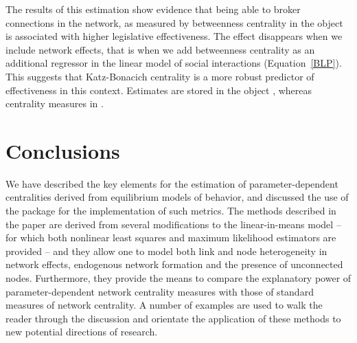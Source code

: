 \documentclass[nojss]{jss}
\begin{document}
%
The results of this estimation show evidence that being able to broker
connections in the network, as measured by betweenness centrality in the
object  is associated with higher legislative
effectiveness.  The effect disappears when we include network effects, that
is when we add betweenness centrality as an additional regressor in the
linear model of social interactions (Equation~\ref{BLP}).  This suggests
that Katz-Bonacich centrality is a more robust predictor of effectiveness in
this context.  Estimates are stored in the object
, whereas centrality measures in
.

\section{Conclusions}\label{sec:conclusion}

We have described the key elements for the estimation of parameter-dependent
centralities derived from equilibrium models of behavior, and discussed the
use of the package  for the implementation of such metrics.  The
methods described in the paper are derived from several modifications to the
linear-in-means model -- for which both nonlinear least squares and maximum
likelihood estimators are provided -- and they allow one to model both link
and node heterogeneity in network effects, endogenous network formation and
the presence of unconnected nodes.  Furthermore, they provide the means to
compare the explanatory power of parameter-dependent network centrality
measures with those of standard measures of network centrality.  A number of
examples are used to walk the reader through the discussion and orientate
the application of these methods to new potential directions of research.


\end{document}
